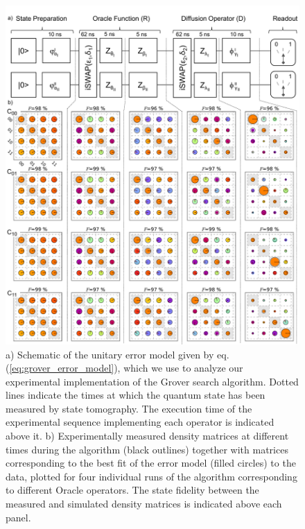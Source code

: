 \begin{figure}[hp!]
	\centering
		\includegraphics[width=\textwidth]{"./data/ct5/2011_04_21 - grover and tomo/good_data/grover - simulated density matrices with errors - with schematic"}
	\caption{a) Schematic of the unitary error model given by eq. (\ref{eq:grover_error_model}), which we use to analyze our experimental implementation of the Grover search algorithm. Dotted lines indicate the times at which the quantum state has been measured by state tomography. The execution time of the experimental sequence implementing each operator is indicated above it. b) Experimentally measured density matrices at different times during the algorithm (black outlines) together with matrices corresponding to the best fit of the error model (filled circles) to the data, plotted for four individual runs of the algorithm corresponding to different Oracle operators. The state fidelity between the measured and simulated density matrices is indicated above each panel.}
	\label{fig:GroverErrorModel}
\end{figure}

